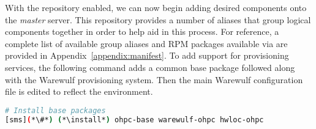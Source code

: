 With the \OHPC{} repository enabled, we can now begin adding desired components onto the
{\em master} server. This repository provides a number of aliases that group
logical components together in order to help aid in this process. For
reference, a complete list of available group aliases and RPM packages available
via \OHPC{} are provided in Appendix~\ref{appendix:manifest}. To add
support for provisioning services, the following command adds a common base
package followed along with the Warewulf provisioning system. Then the main
Warewulf configuration file is edited to reflect the environment.


\begin{lstlisting}[language=bash,keywords={}]
# Install base packages
[sms](*\#*) (*\install*) ohpc-base warewulf-ohpc hwloc-ohpc
\end{lstlisting}



